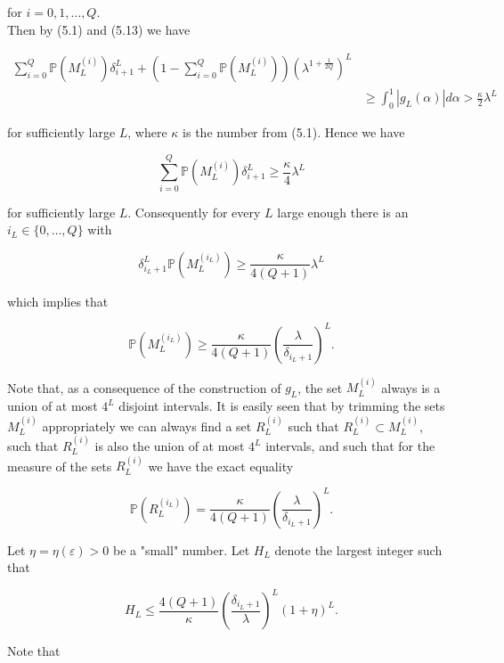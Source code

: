 \documentclass[10pt]{article}
\newcommand{\1}{\mathbf{1}}
\begin{document}
for $i=0,1, \ldots, Q$.\\
Then by (5.1) and (5.13) we have

$$
\begin{aligned}
\sum_{i=0}^{Q} \mathbb{P}\left(M_{L}^{(i)}\right) \delta_{i+1}^{L}+\left(1-\sum_{i=0}^{Q} \mathbb{P}\left(M_{L}^{(i)}\right)\right)\left(\lambda^{1+\frac{1}{2 Q}}\right)^{L} & \\
& \geqslant \int_{0}^{1}\left|g_{L}(\alpha)\right| d \alpha>\frac{\kappa}{2} \lambda^{L}
\end{aligned}
$$

for sufficiently large $L$, where $\kappa$ is the number from (5.1). Hence we have

$$
\sum_{i=0}^{Q} \mathbb{P}\left(M_{L}^{(i)}\right) \delta_{i+1}^{L} \geqslant \frac{\kappa}{4} \lambda^{L}
$$

for sufficiently large $L$. Consequently for every $L$ large enough there is an $i_{L} \in\{0, \ldots, Q\}$ with

$$
\delta_{i_{L}+1}^{L} \mathbb{P}\left(M_{L}^{\left(i_{L}\right)}\right) \geqslant \frac{\kappa}{4(Q+1)} \lambda^{L}
$$

which implies that

$$
\mathbb{P}\left(M_{L}^{\left(i_{L}\right)}\right) \geqslant \frac{\kappa}{4(Q+1)}\left(\frac{\lambda}{\delta_{i_{L}+1}}\right)^{L} .
$$

Note that, as a consequence of the construction of $g_{L}$, the set $M_{L}^{(i)}$ always is a union of at most $4^{L}$ disjoint intervals. It is easily seen that by trimming the sets $M_{L}^{(i)}$ appropriately we can always find a set $R_{L}^{(i)}$ such that $R_{L}^{(i)} \subset M_{L}^{(i)}$,\\
such that $R_{L}^{(i)}$ is also the union of at most $4^{L}$ intervals, and such that for the measure of the sets $R_{L}^{(i)}$ we have the exact equality

$$
\mathbb{P}\left(R_{L}^{\left(i_{L}\right)}\right)=\frac{\kappa}{4(Q+1)}\left(\frac{\lambda}{\delta_{i_{L}+1}}\right)^{L} .
$$

Let $\eta=\eta(\varepsilon)>0$ be a "small" number. Let $H_{L}$ denote the largest integer such that


\begin{equation*}
H_{L} \leqslant \frac{4(Q+1)}{\kappa}\left(\frac{\delta_{i_{L}+1}}{\lambda}\right)^{L}(1+\eta)^{L} . \tag{5.14}
\end{equation*}


Note that
\end{document}
